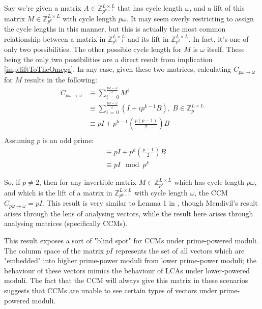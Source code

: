 \documentclass[a4paper, 12pt, reqno]{amsart}
\begin{document}
	Say we're given a matrix $A \in \mathds{Z}_{p^{k-1}}^{L \times L}$ that has cycle length $\omega$, and a lift of this matrix $M \in \mathds{Z}_{p^{k}}^{L \times L}$
	with cycle length $p\omega$. It may seem overly restricting to assign the cycle lengths in this manner, but this is actually the most common relationship between a
	matrix in $\mathds{Z}_{p^{k-1}}^{L \times L}$ and its lift in $\mathds{Z}_{p^{k}}^{L \times L}$. In fact, it's one of only two possibilities. The other possible
	cycle length for $M$ is $\omega$ itself. These being the only two possibilities are a direct result from implication \ref{imp:liftToTheOmega}. In any case, given these
	two matrices, calculating $C_{p\omega \rightarrow \omega}$ for $M$ results in the following:
	\begin{align*}
		C_{p\omega \rightarrow \omega} & \equiv \sum_{i\,=\,0}^{\frac{p\omega - \omega}{\omega}} M^i \\
		                               & \equiv \sum_{i\,=\,0}^{\frac{p\omega - \omega}{\omega}} (I + ip^{k-1}B), \ B \in \mathds{Z}_{p}^{L \times L} \\
									   & \equiv pI + p^{k-1}\left(\frac{p(p-1)}{2}\right)B \\
	\end{align*}
	Assuming $p$ is an odd prime:
	\begin{align*}
		& \equiv pI + p^{k}\left(\frac{p-1}{2}\right)B \\
		& \equiv pI \mod{p^{k}}
	\end{align*}
	
	So, if $p \neq 2$, then for any invertible matrix $M \in \mathds{Z}_{p^{k}}^{L \times L}$ which has cycle length $p\omega$, and which is the lift of a matrix in 
	$\mathds{Z}_{p^{k-1}}^{L \times L}$ with cycle length $\omega$, the CCM $C_{p\omega \rightarrow \omega} = pI$. This result is very similar to Lemma 1 in 
	\citet{Mendivil2012}, though Mendivil's result arises through the lens of analysing vectors, while the result here arises through analysing matrices (specifically CCMs).
	
	This result exposes a sort of "blind spot" for CCMs under prime-powered moduli. The column space of the matrix $pI$ represents the set of all vectors which are 
	"embedded" into higher prime-power moduli from lower prime-power moduli; the behaviour of these vectors mimics the behaviour of LCAs under lower-powered moduli. The
	fact that the CCM will always give this matrix in these scenarios suggests that CCMs are unable to see certain types of vectors under prime-powered moduli.
	
\end{document}
